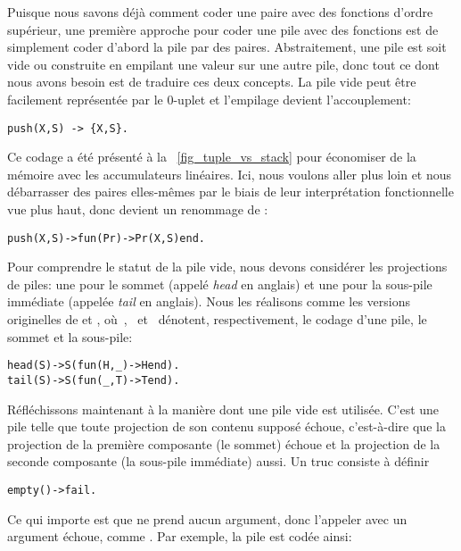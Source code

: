 Puisque nous savons déjà comment coder une paire avec des fonctions
d'ordre supérieur, une première approche pour coder une pile avec des
fonctions est de simplement coder d'abord la pile par des
paires. Abstraitement, une pile est soit vide ou construite en
empilant une valeur sur une autre pile, donc tout ce dont nous avons
besoin est de traduire ces deux concepts. La pile vide peut être
facilement représentée par le \(0\)-uplet \erlcode{\{\}} et l'empilage
devient l'accouplement:
\begin{verbatim}
push(X,S) -> {X,S}.
\end{verbatim}
Ce codage a été présenté à la \fig~\vref{fig_tuple_vs_stack} pour
économiser de la mémoire avec les accumulateurs linéaires. Ici, nous
voulons aller plus loin et nous débarrasser des paires elles-mêmes par
le biais de leur interprétation fonctionnelle vue plus haut, donc
 devient un renommage de :
\begin{alltt}
push(X,S) -> fun(Pr) -> Pr(X,S) end.\hfill% \emph{Voir} mk_pair/2
\end{alltt}
Pour comprendre le statut de la pile vide, nous devons considérer les
projections de piles: une pour le sommet (appelé \emph{head} en
anglais) et une pour la sous-pile immédiate (appelée \emph{tail} en
anglais). Nous les réalisons comme les versions originelles de
 et , où~,
~et~ dénotent, respectivement, le codage d'une
pile, le sommet et la sous-pile:
\begin{alltt}
head(S) -> S(fun(H,\_) -> H end).\hfill% \emph{Voir} fst/2
tail(S) -> S(fun(\_,T) -> T end).\hfill% \emph{Voir} snd/2
\end{alltt}
Réfléchissons maintenant à la manière dont une pile vide est
utilisée. C'est une pile telle que toute projection de son contenu
supposé échoue, c'est-à-dire que la projection de la première
composante (le sommet) échoue et la projection de la seconde
composante (la sous-pile immédiate) aussi. Un truc consiste à définir
\begin{alltt}
empty() -> fail.\hfill% \emph{L'atome} fail \emph{est arbitraire}
\end{alltt}
Ce qui importe est que  ne prend aucun argument, donc
l'appeler avec un argument échoue, comme . Par exemple, la pile \erlcode{[a,b,c]} est codée ainsi:
\begin{center}
\end{center}
